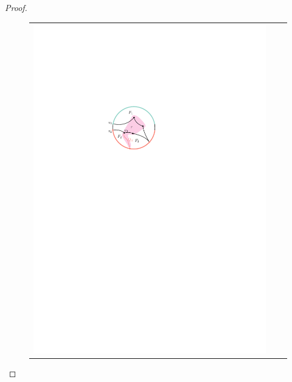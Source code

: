 \documentclass{patmorin}
\theoremstyle{plain}
\theoremstyle{definition}
\begin{document}
\begin{proof}
\begin{figure}
\begin{center}
\begin{tabular}{ccc}
				\includegraphics{figs/zoomba-2} &

\end{tabular}
\end{center}
\end{figure}
\end{proof}
\end{document}
